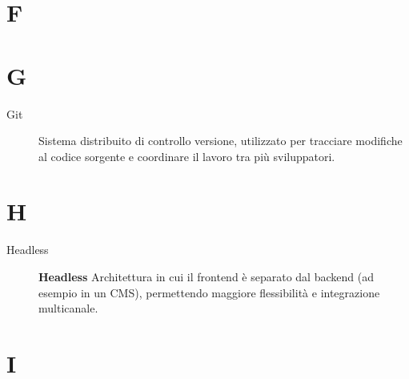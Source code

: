 \section*{F}

\section*{G}
\begin{description}
    \item[Git] Sistema distribuito di controllo versione, utilizzato per tracciare modifiche al codice sorgente e coordinare il lavoro tra più sviluppatori.
\end{description}

\section*{H}
\begin{description}
    \item[Headless] \textbf{Headless} Architettura in cui il frontend è separato dal backend (ad esempio in un CMS), permettendo maggiore flessibilità e integrazione multicanale.
\end{description}

\section*{I}

